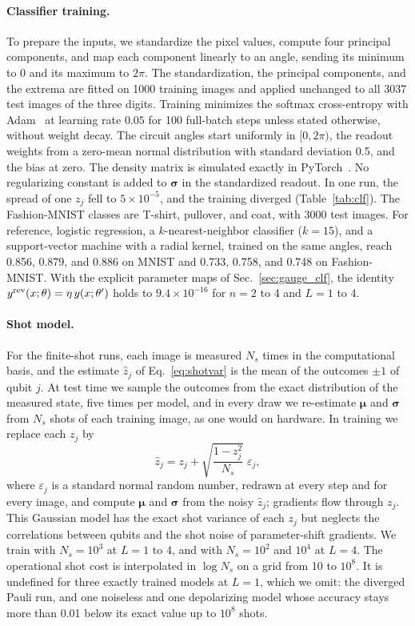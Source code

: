 \documentclass[
 aps,pra,
 twocolumn,
 superscriptaddress,
 longbibliography,
 nofootinbib
]{revtex4-2}
\begin{document}
\paragraph{Classifier training.}
To prepare the inputs, we standardize the pixel values, compute four principal
components, and map each component linearly to an angle, sending its minimum
to 0 and its maximum to $2\pi$. The standardization, the principal components,
and the extrema are fitted on 1000 training images and applied unchanged to all
3037 test images of the three digits. Training minimizes the softmax cross-entropy with Adam~\cite{kingma2014adam} at
learning rate $0.05$ for 100 full-batch steps unless stated otherwise, without
weight decay. The circuit angles start uniformly in $[0,2\pi)$, the readout
weights from a zero-mean normal distribution with standard deviation 0.5, and
the bias at zero. The density matrix
is simulated exactly in PyTorch~\cite{paszke2019pytorch}. No regularizing
constant is added to $\boldsymbol\sigma$ in the standardized readout. In one
run, the spread of one $z_j$ fell to $5\times10^{-5}$, and the training diverged
(Table~\ref{tab:clf}). The Fashion-MNIST classes are T-shirt, pullover, and
coat, with 3000 test images. For reference, logistic regression, a
$k$-nearest-neighbor classifier ($k=15$), and a support-vector machine with a
radial kernel, trained on the same angles, reach 0.856, 0.879, and 0.886 on
MNIST and 0.733, 0.758, and 0.748 on Fashion-MNIST. With the explicit parameter maps of
Sec.~\ref{sec:gauge_clf}, the identity $y^{\rm rev}(x;\theta)=\eta\,y(x;\theta')$
holds to $9.4\times10^{-16}$ for $n=2$ to 4 and $L=1$ to 4.

\paragraph{Shot model.}
For the finite-shot runs, each image is measured $N_s$ times in the
computational basis, and the estimate $\hat z_j$ of Eq.~\eqref{eq:shotvar} is the
mean of the outcomes $\pm1$ of qubit $j$. At test time we sample the outcomes from the exact distribution of
the measured state, five times per model, and in every draw we re-estimate
$\boldsymbol\mu$ and $\boldsymbol\sigma$ from $N_s$ shots of each training
image, as one would on hardware. In training we replace each $z_j$ by
\begin{equation}
\hat z_j=z_j+\sqrt{\frac{1-z_j^2}{N_s}}\;\varepsilon_j ,
\label{eq:shot_train}
\end{equation}
where $\varepsilon_j$ is a standard normal random number, redrawn at every step
and for every image, and compute $\boldsymbol\mu$ and
$\boldsymbol\sigma$ from the noisy $\hat z_j$; gradients flow through $z_j$. This
Gaussian model has the exact shot variance of each $z_j$ but neglects the
correlations between qubits and the shot noise of parameter-shift gradients. We train with
$N_s=10^3$ at $L=1$ to 4, and with $N_s=10^2$ and $10^4$ at $L=4$. The
operational shot cost is interpolated in $\log N_s$ on a grid from 10 to
$10^8$. It is undefined for three exactly trained models at $L=1$, which we
omit: the diverged Pauli run, and one noiseless and one depolarizing model
whose accuracy stays more than 0.01 below its exact value up to $10^8$ shots.
\end{document}
